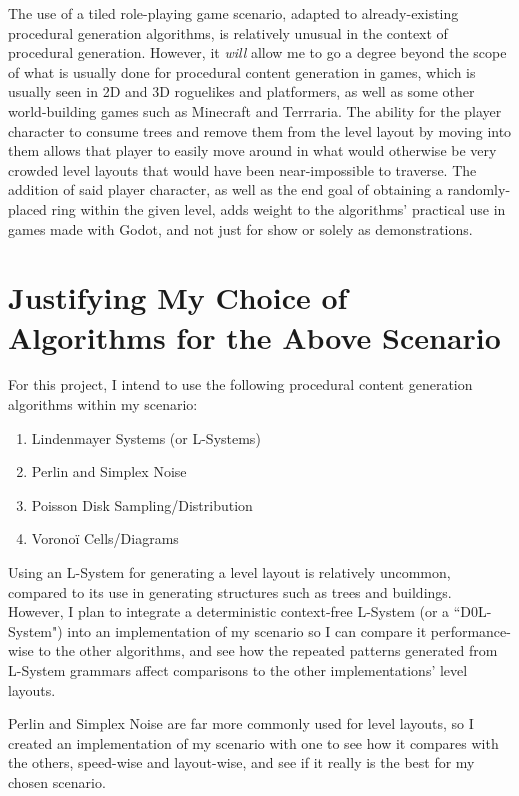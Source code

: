 The use of a tiled role-playing game scenario, adapted to already-existing procedural generation algorithms, is relatively unusual in the context of procedural generation. However, it \textit{will} allow me to go a degree beyond the scope of what is usually done for procedural content generation in games, which is usually seen in 2D and 3D roguelikes and platformers, as well as some other world-building games such as Minecraft and Terrraria. The ability for the player character to consume trees and remove them from the level layout by moving into them allows that player to easily move around in what would otherwise be very crowded level layouts that would have been near-impossible to traverse. The addition of said player character, as well as the end goal of obtaining a randomly-placed ring within the given level, adds weight to the algorithms' practical use in games made with Godot, and not just for show or solely as demonstrations. 

\section{Justifying My Choice of Algorithms for the Above Scenario}

For this project, I intend to use the following procedural content generation algorithms within my scenario:

\begin{enumerate}
    \item Lindenmayer Systems (or L-Systems)
    \item Perlin and Simplex Noise
    \item Poisson Disk Sampling/Distribution
    \item Voronoï Cells/Diagrams
\end{enumerate}

Using an L-System for generating a level layout is relatively uncommon, compared to its use in generating structures such as trees and buildings. However, I plan to integrate a deterministic context-free L-System (or a ``D0L-System") into an implementation of my scenario so I can compare it performance-wise to the other algorithms, and see how the repeated patterns generated from L-System grammars affect comparisons to the other implementations' level layouts. 

Perlin and Simplex Noise are far more commonly used for level layouts, so I created an implementation of my scenario with one to see how it compares with the others, speed-wise and layout-wise, and see if it really is the best for my chosen scenario.

